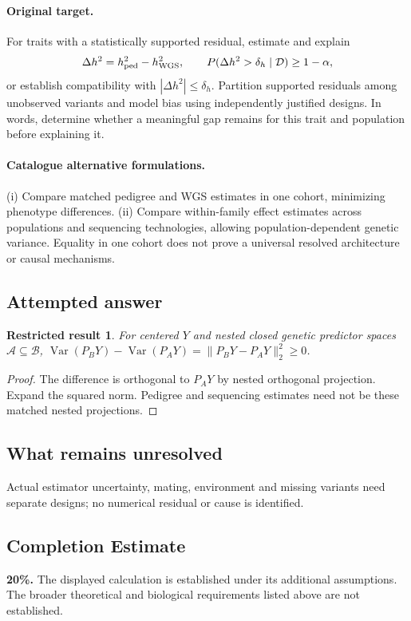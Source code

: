 \documentclass[11pt]{article}
\DeclareMathOperator{\Var}{Var}
\providecommand{\Var}{\operatorname{Var}}
\newtheorem{attemptresult}{Restricted result}[section]
\begin{document}
\paragraph{Original target.}
For traits with a statistically supported residual, estimate and explain
\[
\Delta h^2=h_{\rm ped}^2-h_{\rm WGS}^2,
\qquad P(\Delta h^2>\delta_h\mid\mathcal D)\geq1-\alpha,
\]
or establish compatibility with $|\Delta h^2|\leq\delta_h$. Partition supported residuals among unobserved variants and model bias using independently justified designs. In words, determine whether a meaningful gap remains for this trait and population before explaining it.
\paragraph{Catalogue alternative formulations.}
(i) Compare matched pedigree and WGS estimates in one cohort, minimizing phenotype differences. (ii) Compare within-family effect estimates across populations and sequencing technologies, allowing population-dependent genetic variance. Equality in one cohort does not prove a universal resolved architecture or causal mechanisms.
\subsection{Attempted answer}
\begin{attemptresult}
For centered $Y$ and nested closed genetic predictor spaces $\mathcal A\subseteq\mathcal B$, $\Var(P_BY)-\Var(P_AY)=\|P_BY-P_AY\|_2^2\geq0$.
\end{attemptresult}
\begin{proof}
The difference is orthogonal to $P_AY$ by nested orthogonal projection. Expand the squared norm. Pedigree and sequencing estimates need not be these matched nested projections.
\end{proof}
\subsection{What remains unresolved}
Actual estimator uncertainty, mating, environment and missing variants need separate designs; no numerical residual or cause is identified.
\subsection{Completion Estimate}
\textbf{20\%.} The displayed calculation is established under its additional assumptions. The broader theoretical and biological requirements listed above are not established.
\end{document}
